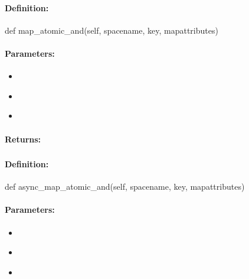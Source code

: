 \paragraph{Definition:}
\begin{pythoncode}
def map_atomic_and(self, spacename, key, mapattributes)
\end{pythoncode}

\paragraph{Parameters:}
\begin{itemize}[noitemsep]
\item {}\\

\item {}\\

\item {}\\

\end{itemize}

\paragraph{Returns:}


\pagebreak
\subsubsection{}
\label{api:python:async_map_atomic_and}


\paragraph{Definition:}
\begin{pythoncode}
def async_map_atomic_and(self, spacename, key, mapattributes)
\end{pythoncode}

\paragraph{Parameters:}
\begin{itemize}[noitemsep]
\item {}\\

\item {}\\

\item {}\\

\end{itemize}

